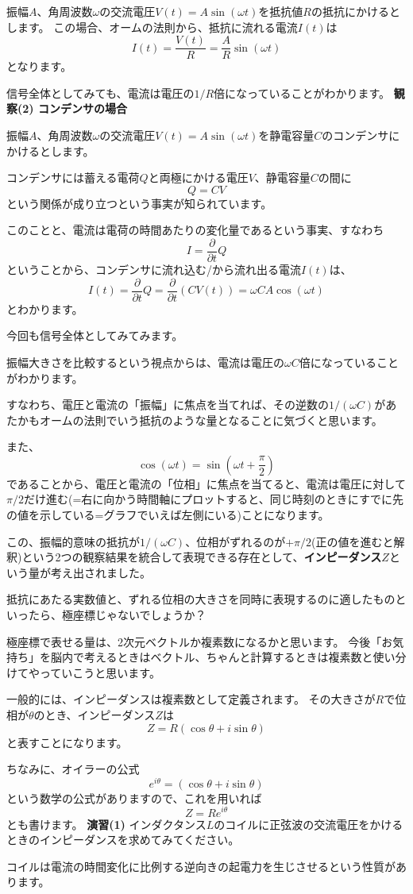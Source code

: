 振幅$A$、角周波数$\omega$の交流電圧$V(t) = A\sin(\omega t)$を抵抗値$R$の抵抗にかけるとします。
この場合、オームの法則から、抵抗に流れる電流$I(t)$は
$$I(t) = \frac{V(t)}{R} = \frac{A}{R}\sin(\omega t)$$
となります。

信号全体としてみても、電流は電圧の$1/R$倍になっていることがわかります。
\newline
\newline
\textbf{観察(2) コンデンサの場合}

振幅$A$、角周波数$\omega$の交流電圧$V(t) = A\sin(\omega t)$を静電容量$C$のコンデンサにかけるとします。

コンデンサには蓄える電荷$Q$と両極にかける電圧$V$、静電容量$C$の間に
$$ Q = CV $$
という関係が成り立つという事実が知られています。

このことと、電流は電荷の時間あたりの変化量であるという事実、すなわち
$$ I = \frac{\partial}{\partial t}Q $$
ということから、コンデンサに流れ込む/から流れ出る電流$I(t)$は、
$$I(t) = \frac{\partial}{\partial t}Q  = \frac{\partial}{\partial t}(CV(t)) = \omega C A\cos(\omega t)$$
とわかります。

今回も信号全体としてみてみます。

振幅大きさを比較するという視点からは、電流は電圧の$\omega C$倍になっていることがわかります。

すなわち、電圧と電流の「振幅」に焦点を当てれば、その逆数の$1/(\omega C)$があたかもオームの法則でいう抵抗のような量となることに気づくと思います。

また、
$$\cos(\omega t) = \sin \left(\omega t + \frac{\pi}{2}\right)$$
であることから、電圧と電流の「位相」に焦点を当てると、電流は電圧に対して$\pi/2$だけ進む(=右に向かう時間軸にプロットすると、同じ時刻のときにすでに先の値を示している=グラフでいえば左側にいる)ことになります。

この、振幅的意味の抵抗が$1/(\omega C)$、位相がずれるのが$+\pi/2$(正の値を進むと解釈)という2つの観察結果を統合して表現できる存在として、\textbf{インピーダンス$Z$}という量が考え出されました。

抵抗にあたる実数値と、ずれる位相の大きさを同時に表現するのに適したものといったら、極座標じゃないでしょうか？

極座標で表せる量は、2次元ベクトルか複素数になるかと思います。
今後「お気持ち」を脳内で考えるときはベクトル、ちゃんと計算するときは複素数と使い分けてやっていこうと思います。

一般的には、インピーダンスは複素数として定義されます。
その大きさが$R$で位相が$\theta$のとき、インピーダンス$Z$は
$$ Z = R(\cos \theta + i \sin \theta)$$
と表すことになります。

ちなみに、オイラーの公式
$$e^{i\theta} = (\cos \theta + i \sin \theta)$$
という数学の公式がありますので、これを用いれば
$$ Z = Re^{i\theta}$$
とも書けます。
\newline
\newline
\textbf{演習(1)} インダクタンス$L$のコイルに正弦波の交流電圧をかけるときのインピーダンスを求めてみてください。

コイルは電流の時間変化に比例する逆向きの起電力を生じさせるという性質があります。